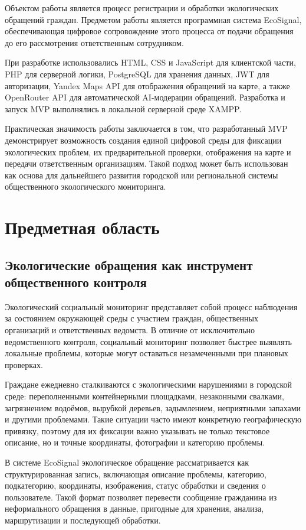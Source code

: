 \documentclass[14pt,a4paper]{extarticle}
\begin{document}
Объектом работы является процесс регистрации и обработки экологических обращений граждан. Предметом работы является программная система EcoSignal, обеспечивающая цифровое сопровождение этого процесса от подачи обращения до его рассмотрения ответственным сотрудником.

При разработке использовались HTML, CSS и JavaScript для клиентской части, PHP для серверной логики, PostgreSQL для хранения данных, JWT для авторизации, Yandex Maps API для отображения обращений на карте, а также OpenRouter API для автоматической AI-модерации обращений. Разработка и запуск MVP выполнялись в локальной серверной среде XAMPP.

Практическая значимость работы заключается в том, что разработанный MVP демонстрирует возможность создания единой цифровой среды для фиксации экологических проблем, их предварительной проверки, отображения на карте и передачи ответственным организациям. Такой подход может быть использован как основа для дальнейшего развития городской или региональной системы общественного экологического мониторинга.

\newpage
\section{Предметная область}

\subsection{Экологические обращения как инструмент общественного контроля}

Экологический социальный мониторинг представляет собой процесс наблюдения за состоянием окружающей среды с участием граждан, общественных организаций и ответственных ведомств. В отличие от исключительно ведомственного контроля, социальный мониторинг позволяет быстрее выявлять локальные проблемы, которые могут оставаться незамеченными при плановых проверках.

Граждане ежедневно сталкиваются с экологическими нарушениями в городской среде: переполненными контейнерными площадками, незаконными свалками, загрязнением водоёмов, вырубкой деревьев, задымлением, неприятными запахами и другими проблемами. Такие ситуации часто имеют конкретную географическую привязку, поэтому для их фиксации важно указывать не только текстовое описание, но и точные координаты, фотографии и категорию проблемы.

В системе EcoSignal экологическое обращение рассматривается как структурированная запись, включающая описание проблемы, категорию, подкатегорию, координаты, изображения, статус обработки и сведения о пользователе. Такой формат позволяет перевести сообщение гражданина из неформального обращения в данные, пригодные для хранения, анализа, маршрутизации и последующей обработки.
\end{document}
